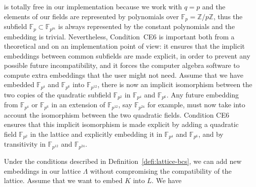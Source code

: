 is totally free in our implementation because we work with $q=p$ and the
elements of our fields are represented by polynomials over
$\mathbb{F}_p=\mathbb{Z}/p\mathbb{Z}$, thus the subfield
$\mathbb{F}_p\subset\mathbb{F}_{p^m}$ is always represented by the constant
polynomials and the embedding is trivial. Nevertheless, Condition~CE6 is
important both from a theoretical and on an implementation point of view: it
ensures that the implicit embeddings between common subfields are made explicit,
in order to prevent any possible future incompatibility, and it forces the
computer algebra software to compute extra embeddings that the user might not
need. Assume that we have embedded $\mathbb{F}_{p^4}$ and $\mathbb{F}_{p^6}$
into $\mathbb{F}_{p^{12}}$, there is now an implicit isomorphism between the two
copies of the quadratic subfield $\mathbb{F}_{p^2}$ in $\mathbb{F}_{p^4}$ and
$\mathbb{F}_{p^6}$. Any future embedding from $\mathbb{F}_{p^4}$ or
$\mathbb{F}_{p^6}$ in an extension of
$\mathbb{F}_{p^{12}}$, say $\mathbb{F}_{p^{24}}$ for example, must now take into
account the isomorphism between the two quadratic fields. Condition CE6 ensures
that this implicit isomorphism is made explicit by adding a quadratic field
$\mathbb{F}_{p^2}$ in the lattice and explicitly embedding it in
$\mathbb{F}_{p^4}$ and $\mathbb{F}_{p^6}$, and by transitivity in
$\mathbb{F}_{p^{12}}$ and $\mathbb{F}_{p^{24}}$.
\begin{center}
\end{center}
Under the conditions described in Definition~\ref{defi:lattice-bcs}, we
can add new embeddings in our lattice $\Lambda$ without compromising the
compatibility of the lattice. Assume that we want to embed $K$ into $L$. We have
